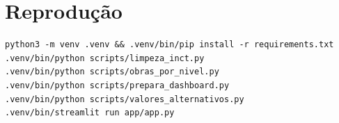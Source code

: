 \documentclass[11pt,a4paper]{article}
\begin{document}
\section{Reprodução}

\begin{verbatim}
python3 -m venv .venv && .venv/bin/pip install -r requirements.txt
.venv/bin/python scripts/limpeza_inct.py
.venv/bin/python scripts/obras_por_nivel.py
.venv/bin/python scripts/prepara_dashboard.py
.venv/bin/python scripts/valores_alternativos.py
.venv/bin/streamlit run app/app.py
\end{verbatim}
\end{document}
